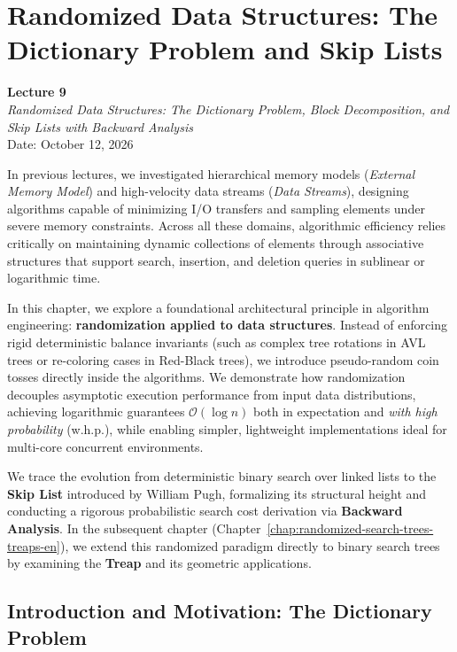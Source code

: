 \chapter{Randomized Data Structures: The Dictionary Problem and Skip Lists}
\label{chap:randomized-data-structures}

\begin{center}
  \textbf{Lecture 9}\\
  \emph{Randomized Data Structures: The Dictionary Problem, Block Decomposition, and Skip Lists with Backward Analysis}\\[0.5em]
  Date: October 12, 2026
\end{center}

In previous lectures, we investigated hierarchical memory models (\textit{External Memory Model}) and high-velocity data streams (\textit{Data Streams}), designing algorithms capable of minimizing I/O transfers and sampling elements under severe memory constraints. Across all these domains, algorithmic efficiency relies critically on maintaining dynamic collections of elements through associative structures that support search, insertion, and deletion queries in sublinear or logarithmic time.

In this chapter, we explore a foundational architectural principle in algorithm engineering: \textbf{randomization applied to data structures}. Instead of enforcing rigid deterministic balance invariants (such as complex tree rotations in AVL trees or re-coloring cases in Red-Black trees), we introduce pseudo-random coin tosses directly inside the algorithms. We demonstrate how randomization decouples asymptotic execution performance from input data distributions, achieving logarithmic guarantees $\mathcal{O}(\log n)$ both in expectation and \textit{with high probability} (w.h.p.), while enabling simpler, lightweight implementations ideal for multi-core concurrent environments.

We trace the evolution from deterministic binary search over linked lists to the \textbf{Skip List} introduced by William Pugh, formalizing its structural height and conducting a rigorous probabilistic search cost derivation via \textbf{Backward Analysis}. In the subsequent chapter (Chapter~\ref{chap:randomized-search-trees-treaps-en}), we extend this randomized paradigm directly to binary search trees by examining the \textbf{Treap} and its geometric applications.

\FloatBarrier
\section{Introduction and Motivation: The Dictionary Problem}
\label{sec:dictionary-problem-and-motivation}

